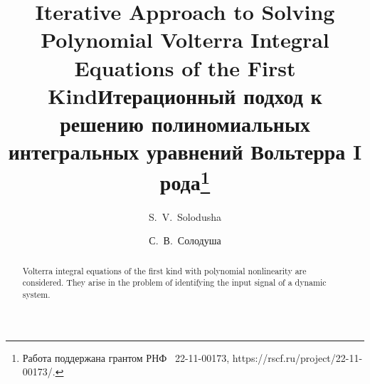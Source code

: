 \begin{englishtitle} %
\title{Iterative Approach to Solving Polynomial Volterra Integral Equations of the First Kind}
\author{S.~V.~Solodusha  }

\maketitle

\begin{abstract}
Volterra integral equations of the first kind with polynomial nonlinearity are considered. They arise in the problem of identifying the input signal of a dynamic system.

\end{abstract}
\end{englishtitle}

\iffalse
\documentclass[12pt]{llncs}


\usepackage{iftex}

\ifPDFTeX
\usepackage[T2A]{fontenc}
\usepackage[utf8]{inputenc} %
\usepackage[english,russian]{babel}
\fi

\usepackage{todonotes}

\usepackage[russian]{nla}



\fi

\title{Итерационный подход к решению полиномиальных интегральных уравнений Вольтерра I рода\thanks{Работа поддержана грантом РНФ \textnumero~22-11-00173, https://rscf.ru/project/22-11-00173/.}
}
\author{С.~В.~Солодуша %
} %


